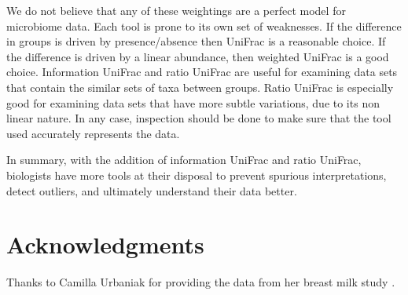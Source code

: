 \documentclass[10pt,letterpaper]{article}
\begin{document}
We do not believe that any of these weightings are a perfect model for microbiome data. Each tool is prone to its own set of weaknesses. If the difference in groups is driven by presence/absence then UniFrac is a reasonable choice. If the difference is driven by a linear abundance, then weighted UniFrac is a good choice. Information UniFrac and ratio UniFrac are useful for examining data sets that contain the similar sets of taxa between groups. Ratio UniFrac is especially good for examining data sets that have more subtle variations, due to its non linear nature. In any case, inspection should be done to make sure that the tool used accurately represents the data.

In summary, with the addition of information UniFrac and ratio UniFrac, biologists have more tools at their disposal to prevent spurious interpretations, detect outliers, and ultimately understand their data better.

\section*{Acknowledgments}
Thanks to Camilla Urbaniak for providing the data from her breast milk study \cite{urbaniak2016human}.

\nolinenumbers

%
%
% 

\end{document}
